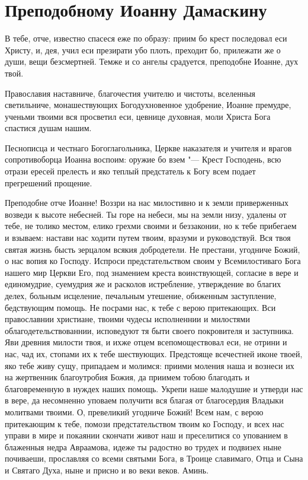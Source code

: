 \section{Преподобному Иоанну Дамаскину}\begin{mymulticols}


В тебе, отче, известно спасеся еже по образу: приим бо крест последовал еси Христу, и, дея, учил еси презирати убо плоть, преходит бо, прилежати же о души, вещи безсмертней. Темже и со ангелы срадуется, преподобне Иоанне, дух твой.


Православия наставниче, благочестия учителю и чистоты, вселенныя светильниче, монашествующих Богодухновенное удобрение, Иоанне премудре, ученьми твоими вся просветил еси, цевнице духовная, моли Христа Бога спастися душам нашим.


Песнописца и честнаго Богоглагольника, Церкве наказателя и учителя и врагов сопротивоборца Иоанна воспоим: оружие бо взем "--- Крест Господень, всю отрази ересей прелесть и яко теплый предстатель к Богу всем подает прегрешений прощение.


Преподобне отче Иоанне! Воззри на нас милостивно и к земли приверженных возведи к высоте небесней. Ты горе на небеси, мы на земли низу, удалены от тебе, не толико местом, елико грехми своими и беззаконии, но к тебе прибегаем и взываем: настави нас ходити путем твоим, вразуми и руководствуй. Вся твоя святая жизнь бысть зерцалом всякия добродетели. Не престани, угодниче Божий, о нас вопия ко Господу. Испроси предстательством своим у Всемилостиваго Бога нашего мир Церкви Его, под знамением креста воинствующей, согласие в вере и единомудрие, суемудрия же и расколов истребление, утверждение во благих делех, больным исцеление, печальным утешение, обиженным заступление, бедствующим помощь. Не посрами нас, к тебе с верою притекающих. Вси православнии христиане, твоими чудесы исполненнии и милостями облагодетельствованнии, исповедуют тя быти своего покровителя и заступника. Яви древния милости твоя, и ихже отцем всепомоществовал еси, не отрини и нас, чад их, стопами их к тебе шествующих. Предстояще всечестней иконе твоей, яко тебе живу сущу, припадаем и молимся: приими моления наша и вознеси их на жертвенник благоутробия Божия, да приимем тобою благодать и благовременную в нуждех наших помощь. Укрепи наше малодушие и утверди нас в вере, да несомненно уповаем получити вся благая от благосердия Владыки молитвами твоими. О, превеликий угодниче Божий! Всем нам, с верою притекающим к тебе, помози предстательством твоим ко Господу, и всех нас управи в мире и покаянии скончати живот наш и преселитися со упованием в блаженныя недра Авраамова, идеже ты радостно во трудех и подвизех ныне почиваеши, прославляя со всеми святыми Бога, в Троице славимаго, Отца и Сына и Святаго Духа, ныне и присно и во веки веков. Аминь.

\end{mymulticols}

